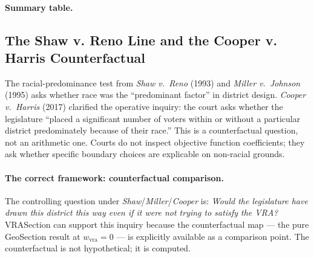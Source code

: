 \paragraph{Summary table.}
\begin{table}[htbp]
\centering
\small
\caption{$w_\text{vra}$ regimes and their properties.}
\label{tab:wvra}
\end{table}

\subsection{The Shaw v. Reno Line and the Cooper v. Harris Counterfactual}
\label{sec:shaw-line}

The racial-predominance test from \emph{Shaw v.\ Reno} (1993) and
\emph{Miller v.\ Johnson} (1995) asks whether race was the ``predominant
factor'' in district design.
\emph{Cooper v.\ Harris} (2017) clarified the operative inquiry: the court
asks whether the legislature ``placed a significant number of voters within
or without a particular district predominately because of their race.''
This is a counterfactual question, not an arithmetic one.
Courts do not inspect objective function coefficients; they ask whether
specific boundary choices are explicable on non-racial grounds.

\paragraph{The correct framework: counterfactual comparison.}
The controlling question under \emph{Shaw}/\emph{Miller}/\emph{Cooper} is:
\emph{Would the legislature have drawn this district this way even if it
were not trying to satisfy the VRA?}
VRASection can support this inquiry because the counterfactual map --- the pure
GeoSection result at $w_\text{vra} = 0$ --- is explicitly available as a
comparison point.
The counterfactual is not hypothetical; it is computed.

